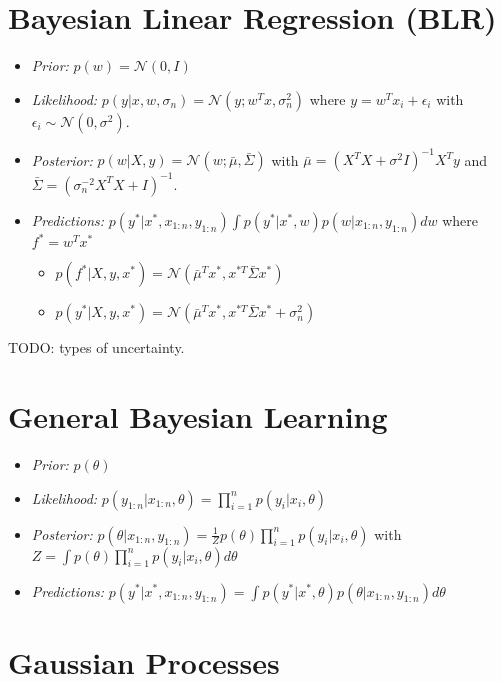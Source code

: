 \documentclass[11pt]{article}
\newcommand{\gauss}{\mathcal{N}}
\begin{document}
	
	\begin{multicols*}{3}
	
	
	
	\section*{Bayesian Linear Regression (BLR)}
	\begin{itemize}
		\item \textit{Prior:} $p(w) = \gauss (0,I)$
\item \textit{Likelihood:} $p(y|x,w,\sigma_n) = \gauss (y;w^Tx,\sigma^2_{n})$ where $y = w^Tx_i + \epsilon_i$ with $\epsilon_i \sim \gauss(0,\sigma^2)$.
\item \textit{Posterior:} $p(w|X,y) = \gauss(w;\bar{\mu},\bar{\Sigma})$ with $\bar{\mu} = (X^TX + \sigma^2 I )^{-1}X^Ty$ and $\bar{\Sigma} = (\sigma_n^{-2}X^T X + I)^{-1}$.
\item \textit{Predictions:} $ p(y^* | x^*, x_{1:n}, y_{1:n}) \int p(y^*|x^*, w) p(w | x_{1:n}, y_{1:n}) dw$ where $f^* = w^T x^*$
\begin{itemize}
	\item $p(f^*| X,y,x^*) = \gauss(\bar{\mu}^T x^*, x^{*T}\bar{\Sigma} x^*)$
	\item $p(y^*| X,y,x^*) = \gauss(\bar{\mu}^T x^*, x^{*T}\bar{\Sigma} x^* + \sigma_n^2)$
\end{itemize}
	\end{itemize}
	
	TODO: types of uncertainty.
	
	\section*{General Bayesian Learning}
	\begin{itemize}
		\item \textit{Prior:} $p(\theta)$
		\item \textit{Likelihood:} $p(y_{1:n}| x_{1:n}, \theta) = \prod_{i=1}^{n} p(y_i | x_i, \theta)$
		\item \textit{Posterior:} $p(\theta | x_{1:n}, y_{1:n}) = \frac{1}{Z} p(\theta) \prod_{i=1}^{n} p(y_i | x_i, \theta)$ with $Z = \int p(\theta) \prod_{i=1}^{n} p(y_i | x_i, \theta) d\theta$
		\item \textit{Predictions:} $p(y^* | x^*, x_{1:n}, y_{1:n}) = \int p(y^*|x^*, \theta)p(\theta | x_{1:n}, y_{1:n}) d\theta$
	\end{itemize}
	
	\section*{Gaussian Processes}
	

\end{multicols*}
\end{document}
